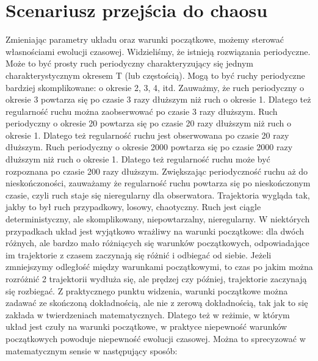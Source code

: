 \documentclass[a4paper,12pt,polish]{sphinxmanual}
\begin{document}
\section{Scenariusz przejścia do chaosu}
\label{ch2/chII012::doc}\label{ch2/chII012:scenariusz-przejscia-do-chaosu}
Zmieniając parametry układu oraz warunki początkowe, możemy sterować własnościami ewolucji czasowej. Widzieliśmy, że istnieją rozwiązania periodyczne. Może to być prosty ruch periodyczny charakteryzujący się jednym charakterystycznym okresem T (lub częstością).  Mogą to być ruchy periodyczne bardziej skomplikowane:  o okresie 2, 3, 4, itd. Zauważmy, że ruch periodyczny o okresie 3 powtarza się po czasie 3 razy dłuższym niż ruch o okresie 1. Dlatego też regularność ruchu można zaobserwować po czasie  3 razy dłuższym.   Ruch periodyczny o okresie 20 powtarza się po czasie 20 razy dłuższym niż ruch o okresie 1. Dlatego też regularność ruchu jest obserwowana po czasie 20 razy dłuższym.  Ruch periodyczny o okresie 2000 powtarza się po czasie 2000 razy dłuższym niż ruch o okresie 1. Dlatego też regularność ruchu może być rozpoznana po czasie  200 razy dłuższym.  Zwiększając periodyczność ruchu aż do nieskończoności, zauważamy że regularność ruchu powtarza się po nieskończonym czasie, czyli ruch staje się nieregularny dla obserwatora. Trajektoria wygląda tak, jakby to był ruch przypadkowy, losowy, chaotyczny. Ruch jest ciągle deterministyczny, ale skomplikowany,  niepowtarzalny, nieregularny. W niektórych przypadkach układ jest wyjątkowo wrażliwy na warunki początkowe: dla dwóch różnych, ale bardzo mało różniących się warunków początkowych, odpowiadające im trajektorie z czasem zaczynają się różnić i odbiegać od siebie. Jeżeli zmniejszymy odległość między warunkami początkowymi, to czas po jakim można rozróżnić  2 trajektorii wydłuża się, ale prędzej czy później, trajektorie zaczynają się rozbiegać. Z praktycznego punktu widzenia, warunki początkowe można zadawać ze skończoną dokładnością, ale nie z zerową dokładnością, tak jak to się zakłada w twierdzeniach matematycznych. Dlatego też w reżimie, w którym układ jest czuły na warunki początkowe, w praktyce niepewność warunków początkowych powoduje niepewność  ewolucji czasowej. Można to sprecyzować w matematycznym sensie w następujący sposób:
\end{document}
